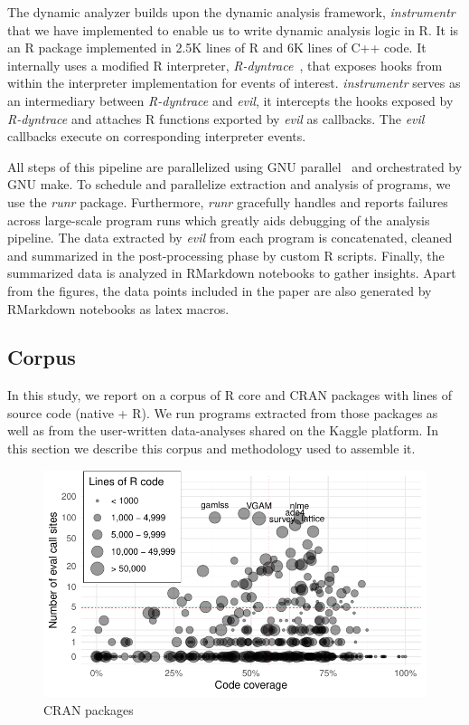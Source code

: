 \documentclass[USenglish,cleveref, autoref, thm-restate]{lipics-v2019}
\newcommand{\evil}{\emph{evil}\xspace}
\newcommand{\instrumentr}{\emph{instrumentr}\xspace}
\newcommand{\rdyntrace}{\emph{R-dyntrace}\xspace}
\newcommand{\runr}{\emph{runr}\xspace}
\begin{document}
The dynamic analyzer builds upon the dynamic analysis framework, \instrumentr
that we have implemented to enable us to write dynamic analysis logic in R. It
is an R package implemented in 2.5K lines of R and 6K lines of C++ code. It
internally uses a modified R interpreter, \rdyntrace~\cite{oopsla19a}, that
exposes hooks from within the interpreter implementation for events of interest.
\instrumentr serves as an intermediary between \rdyntrace and \evil, it
intercepts the hooks exposed by \rdyntrace and attaches R functions exported by
\evil as callbacks. The \evil callbacks execute on corresponding interpreter
events.

All steps of this pipeline are parallelized using GNU
parallel~\cite{GNUparallel} and orchestrated by GNU make. To schedule and
parallelize extraction and analysis of programs, we use the \runr
package. Furthermore, \runr gracefully handles and reports failures across
large-scale program runs which greatly aids debugging of the analysis
pipeline.  The data extracted by \evil from each program is concatenated,
cleaned and summarized in the post-processing phase by custom R
scripts. Finally, the summarized data is analyzed in RMarkdown notebooks to
gather insights. Apart from the figures, the data points included in the
paper are also generated by RMarkdown notebooks as latex macros.

\subsection{Corpus}

In this study, we report on a corpus of \CorpusCorePackages R core and
\CorpusPackages CRAN packages with \CorpusAllCodeRnd lines of source code
(native + R).  We run \CorpusAllProgramsRnd programs extracted from those
packages as well as from the user-written data-analyses shared on the Kaggle
platform. In this section we describe this corpus and methodology used to
assemble it.

\begin{figure}[!h]\centering\includegraphics[width=\linewidth]
  {corpus.pdf}\caption{CRAN packages}\label{fig:corpus}
\end{figure}
\end{document}
